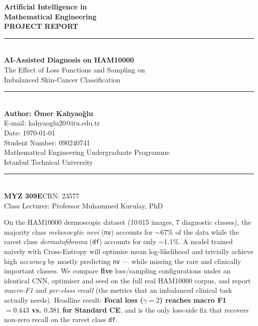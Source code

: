 \documentclass[11pt,a4paper]{article}
\theoremstyle{definition}
\begin{document}
\begin{center}
{\Huge\bfseries\sffamily\color{blue!70!black} Artificial Intelligence in}\\[0.3em]
{\Huge\bfseries\sffamily\color{blue!70!black} Mathematical Engineering}\\[0.6em]
{\LARGE\bfseries\sffamily PROJECT REPORT}\\[0.2em]
\rule{0.82\textwidth}{1.5pt}\\[0.6em]
{\LARGE\bfseries\sffamily AI-Assisted Diagnosis on HAM10000}\\[0.4em]
{\large\sffamily The Effect of Loss Functions and Sampling on}\\[0.2em]
{\large\sffamily Imbalanced Skin-Cancer Classification}\\[0.6em]
\rule{0.82\textwidth}{1.5pt}\\[0.6em]
{\LARGE\bfseries\sffamily Author: Ömer Kahyaoğlu}\\[0.2em]
{\Large\sffamily E-mail: kahyaoglu20@itu.edu.tr}\\[0.4em]
{\Large\sffamily Date: \today}\\[0.4em]
{\Large\sffamily Student Number: 090240741}\\[0.8em]
{\large Mathematical Engineering Undergraduate Programme}\\[0.4em]
{\normalsize Istanbul Technical University}\\[0.3em]
\rule{0.82\textwidth}{1.5pt}\\[0.5em]
{\small\sffamily\textbf{MYZ 309E}\quad CRN: 23577}\\
{\small\sffamily Class Lecturer: Professor Muhammed Kurulay, PhD}\\
\end{center}

\vspace{0.4em}

\begin{problembox}
On the HAM10000 dermoscopic dataset (10\,015 images, 7 diagnostic classes), the
majority class \textit{melanocytic nevi} (\texttt{nv}) accounts for $\sim$67\% of
the data while the rarest class \textit{dermatofibroma} (\texttt{df}) accounts
for only $\sim$1.1\%. A model trained naively with Cross-Entropy will optimise
mean log-likelihood and trivially achieve high \emph{accuracy} by mostly
predicting \texttt{nv} --- while missing the rare and clinically important
classes. We compare \textbf{five} loss/sampling configurations under an
identical CNN, optimiser and seed on the full real HAM10000 corpus, and report
\emph{macro-F1} and \emph{per-class recall} (the metrics that an imbalanced
clinical task actually needs). Headline result: \textbf{Focal loss
($\gamma{=}2$) reaches macro F1 $\mathbf{=0.443}$ vs. $0.381$ for Standard
CE}, and is the only loss-side fix that recovers non-zero recall on the
rarest class \texttt{df}.
\end{problembox}
\end{document}
